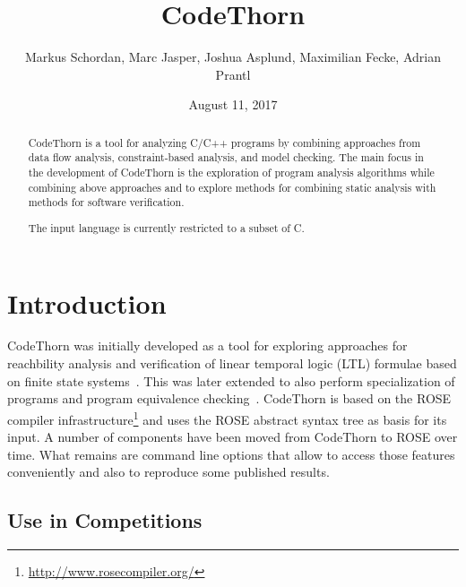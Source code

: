 \documentclass[natbib]{article}
\begin{document}
\title{CodeThorn}

\author{\small Markus Schordan, Marc Jasper, Joshua Asplund, Maximilian Fecke, Adrian Prantl}
\date{August 11, 2017}

\maketitle

\begin{abstract}
\noindent CodeThorn is a tool for analyzing C/C++ programs by combining approaches
from data flow analysis, constraint-based analysis, and model
checking. The main focus in the development of CodeThorn is the
exploration of program analysis algorithms while combining above
approaches and to explore methods for combining static analysis with
methods for software verification.

The input language is currently restricted to a subset of C.

\end{abstract}

\tableofcontents


\section{Introduction}
\label{sec:intro}

CodeThorn was initially developed as a tool for exploring approaches
for reachbility analysis and verification of linear temporal logic (LTL)
formulae based on finite state systems~\cite{schordan2014combining}. 
This was later extended to
also perform specialization of programs and program equivalence
checking~\cite{schordan2014verification}. CodeThorn is based on the 
ROSE compiler infrastructure\footnote{\url{http://www.rosecompiler.org/}} 
and uses the ROSE abstract syntax tree as basis for its input. 
A number of components have been moved
from CodeThorn to ROSE over time. What remains are command line
options that allow to access those features conveniently and also to
reproduce some published results.

\nocite{roseWWW}

\subsection{Use in Competitions}
\end{document}

